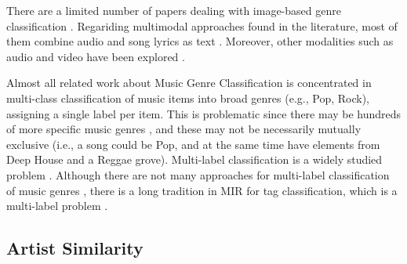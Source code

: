 There are a limited number of papers dealing with image-based genre classification \citep{libeks2011you}.
Regariding multimodal approaches found in the literature, most of them combine audio and song lyrics as text \citep{laurier2008multimodal,neumayer2007integration}. Moreover, other modalities such as audio and video have been explored \citep{schindler2015audio}. 

Almost all related work about Music Genre Classification is concentrated in multi-class classification of music items into broad genres (e.g., Pop, Rock), assigning a single label per item. This is problematic since there may be hundreds of more specific music genres \citep{pachet2000taxonomy}, and these may not be necessarily mutually exclusive (i.e., a song could be Pop, and at the same time have elements from Deep House and a Reggae grove). 
Multi-label classification is a widely studied problem \citep{tsoumakas2006multi,jain2016extreme}. 
Although there are not many approaches for multi-label classification of music genres \citep{Sanden2011,wang2009tag}, there is a long tradition in MIR for tag classification, which is a multi-label problem \citep{Choi2016,wang2009tag}.


\subsection{Artist Similarity}
\label{sec:SOA:mir:similarity}

